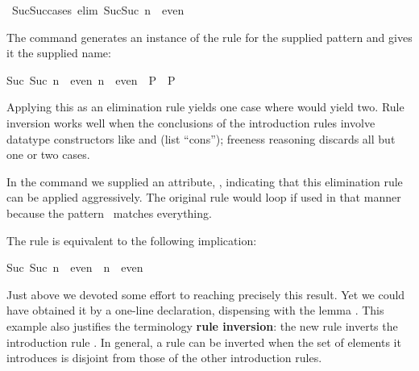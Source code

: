 \begin{isabellebody}
\ Suc{}Suc{}cases\ {}elim{}{}{}\ {}Suc{}Suc\ n{}\ {}\ even{}%
\begin{isamarkuptext}%
The  command generates an instance of
the  rule for the supplied pattern and gives it the supplied name:
\begin{isabelle}%
{}Suc\ {}Suc\ n{}\ {}\ even{}\ n\ {}\ even\ {}\ P{}\ {}\ P%
\end{isabelle}
Applying this as an elimination rule yields one case where 
would yield two.  Rule inversion works well when the conclusions of the
introduction rules involve datatype constructors like  and 
(list ``cons''); freeness reasoning discards all but one or two cases.

In the  command we supplied an
attribute, ,
%
indicating that this elimination rule can be
applied aggressively.  The original
 rule would loop if used in that manner because the
pattern~ matches everything.

The rule  is equivalent to the following implication:
\begin{isabelle}%
Suc\ {}Suc\ n{}\ {}\ even\ {}\ n\ {}\ even%
\end{isabelle}
Just above we devoted some effort to reaching precisely
this result.  Yet we could have obtained it by a one-line declaration,
dispensing with the lemma . 
This example also justifies the terminology
\textbf{rule inversion}: the new rule inverts the introduction rule
.  In general, a rule can be inverted when the set of elements
it introduces is disjoint from those of the other introduction rules.


\end{isamarkuptext}
\end{isabellebody}
